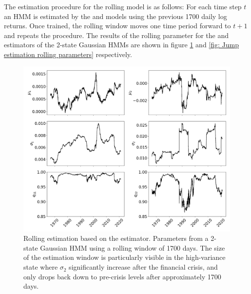 The estimation procedure for the rolling model is as follows: For each time step $t$ an HMM is estimated by the \mle and \jump models using the previous 1700 daily log returns. Once trained, the rolling window moves one time period forward to $t+1$ and repeats the procedure. The results of the rolling parameter for the \mle and \jump estimators of the 2-state Gaussian HMMs are shown in figure \ref{fig: MLE estimation rolling parameters} and \ref{fig: Jump estimation rolling parameters} respectively.

\begin{figure}[H] 
    \centering
    \includegraphics[width=1.0\textwidth]{analysis/stylized_facts/images/2-state MLE HMM rolling params.png}
    \caption[Rolling estimation based on the \mle estimator]{Rolling estimation based on the \mle estimator. Parameters from a 2-state Gaussian HMM using a rolling window of 1700 days. The size of the estimation window is particularly visible in the high-variance state where $\sigma_2$ significantly increase after the financial crisis, and only drops back down to pre-crisis levels after approximately 1700 days.}
    \label{fig: MLE estimation rolling parameters} 
\end{figure}

